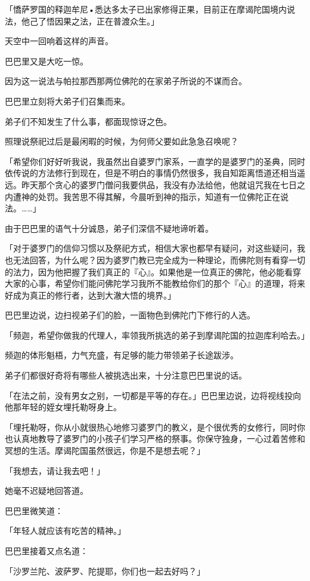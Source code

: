 \documentclass[twoside,openany]{book}
\begin{document}
「憍萨罗国的释迦牟尼•悉达多太子已出家修得正果，目前正在摩谒陀国境内说法，他己了悟因果之法，正在普渡众生。」

天空中一回响着这样的声音。

巴巴里又是大吃一惊。

因为这一说法与帕拉那西那两位佛陀的在家弟子所说的不谋而合。

巴巴里立刻将大弟子们召集而来。

弟子们不知发生了什么事，都面现惊讶之色。

照理说祭祀过后是最闲暇的时候，为何师父要如此急急召唤呢？

「希望你们好好听我说，我虽然出自婆罗门家系，一直学的是婆罗门的圣典，同时依传说的方法修行到现在，但是不明白的事情仍然很多，我自知距离悟道还相当遥远。昨天那个贪心的婆罗门僧问我要供品，我没有办法给他，他就诅咒我在七日之内遭神的处罚。我苦思不得其解，今晨听到神的指示，知道有一位佛陀正在说法。……」

由于巴巴里的语气十分诚恳，弟子们深信不疑地谛听着。

「对于婆罗门的信仰习惯以及祭祀方式，相信大家也都早有疑问，对这些疑问，我也无法回答，为什么呢？因为婆罗门教已完全成为一种理论，而佛陀则有看穿一切的法力，因为他把握了我们真正的『心』。如果他是一位真正的佛陀，他必能看穿大家的心事，希望你们能问佛陀学习我所不能教给你们的那个『心』的道理，将来好成为真正的修行者，达到大澈大悟的境界。」

巴巴里边说，边扫视弟子们的脸，一面物色到佛陀门下修行的人选。

「频迦，希望你做我的代理人，率领我所挑选的弟子到摩谒陀国的拉迦库利哈去。」

频迦的体形魁梧，力气充盛，有足够的能力带领弟子长途跋涉。

弟子们都很好奇将有哪些人被挑选出来，十分注意巴巴里说的话。

「在法之前，没有男女之别，一切都是平等的存在。」巴巴里边说，边将视线投向他那年轻的姪女埋托勒呀身上。

「埋托勒呀，你从小就很热心地修习婆罗门的教义，是个很优秀的女修行，同时你也认真地教导了婆罗门的小孩子们学习严格的祭事。你保守独身，一心过着苦修和冥想的生活。摩谒陀国虽然很远，你是不是想去呢？」

「我想去，请让我去吧！」

她毫不迟疑地回答道。

巴巴里微笑道：

「年轻人就应该有吃苦的精神。」

巴巴里接着又点名道：

「沙罗兰陀、波萨罗、陀提耶，你们也一起去好吗？」
\end{document}
